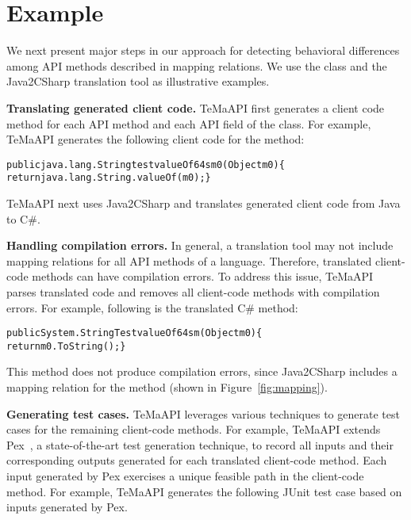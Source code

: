 \section{Example}
\label{sec:example}

We next present major steps in our approach for detecting behavioral differences among API methods described in mapping relations. We use the  class and the Java2CSharp translation tool as illustrative examples. 

\textbf{Translating generated client code.} TeMaAPI first generates a client code method for each API method and each API field of the  class. For example, TeMaAPI generates the following client code for the  method:

\begin{CodeOut}%
\begin{alltt}
  public java.lang.String testvalueOf64sm0(Object m0) \{
    return java.lang.String.valueOf(m0); \}
\end{alltt}
\end{CodeOut}

TeMaAPI next uses Java2CSharp and translates generated client code from Java to C\#.

\textbf{Handling compilation errors.} In general, a translation tool may not include mapping relations for all API methods of a language. Therefore, translated client-code methods can have compilation errors. To address this issue, TeMaAPI parses translated code and removes all client-code methods with compilation errors. For example, following is the translated C\#  method:

\begin{CodeOut}%
\begin{alltt}
  public System.String TestvalueOf64sm(Object m0) \{
    return m0.ToString();\}
\end{alltt}
\end{CodeOut}

This method does not produce compilation errors, since Java2CSharp includes a mapping relation for the method (shown in Figure~\ref{fig:mapping}).

\textbf{Generating test cases.} TeMaAPI leverages various techniques to generate test cases for the remaining client-code methods. For example, TeMaAPI extends Pex~\cite{tillmann2008pex}, a state-of-the-art test generation technique, to record all inputs and their corresponding outputs generated for each translated client-code method. Each input generated by Pex exercises a unique feasible path in the client-code method. For example, TeMaAPI generates the following JUnit test case based on inputs generated by Pex.

